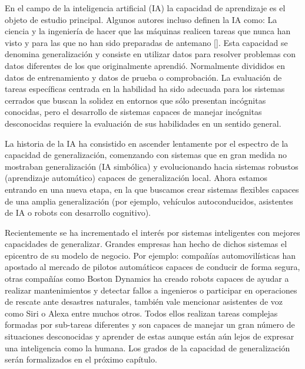 En el campo de la inteligencia artificial (IA) la capacidad de aprendizaje es el objeto de estudio principal. Algunos autores incluso definen la IA como: La ciencia y la ingeniería de hacer que las máquinas realicen tareas que nunca han visto y para las que no han sido preparadas de antemano [\cite{mccarthy1987generality}]. Esta capacidad se denomina generalización y consiste en utilizar datos para resolver problemas con datos diferentes de los que originalmente aprendió. Normalmente divididos en datos de entrenamiento y datos de prueba o comprobación. La evaluación de tareas específicas centrada en la habilidad ha sido adecuada para los sistemas cerrados que buscan la solidez en entornos que sólo presentan incógnitas conocidas, pero el desarrollo de sistemas capaces de manejar incógnitas desconocidas requiere la evaluación de sus habilidades en un sentido general.

La historia de la IA ha consistido en ascender lentamente por el espectro de la capacidad de generalización, comenzando con sistemas que en gran medida no mostraban generalización (IA simbólica) y evolucionando hacia sistemas robustos (aprendizaje automático) capaces de generalización local. Ahora estamos entrando en una nueva etapa, en la que buscamos crear sistemas flexibles capaces de una amplia generalización (por ejemplo, vehículos autoconducidos, asistentes de IA o robots con desarrollo cognitivo). 

Recientemente se ha incrementado el interés por sistemas inteligentes con mejores capacidades de generalizar. Grandes empresas han hecho de dichos sistemas el epicentro de su modelo de negocio. Por ejemplo: compañías automovilísticas han apostado al mercado de pilotos automáticos capaces de conducir de forma segura, otras compañías como Boston Dynamics ha creado robots capaces de ayudar a realizar mantenimientos y detectar fallos a ingenieros o participar en operaciones de rescate ante desastres naturales, también vale mencionar asistentes de voz como Siri o Alexa entre muchos otros. Todos ellos realizan tareas complejas formadas por sub-tareas diferentes y son capaces de manejar un gran número de situaciones desconocidas y aprender de estas aunque están aún lejos de expresar una inteligencia como la humana. Los grados de la capacidad de generalización serán formalizados en el próximo capítulo.

